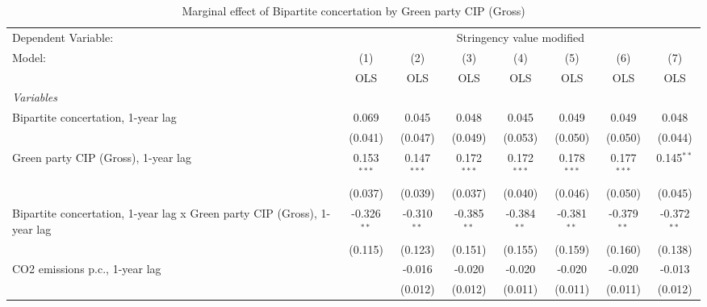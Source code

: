 
\begin{table}[htbp]
   \caption{Marginal effect of Bipartite concertation by Green party CIP (Gross)}
   \centering
   \begin{tabular}{lccccccc}
      \toprule
      Dependent Variable: & \multicolumn{7}{c}{Stringency value modified}\\
      Model:                                                                   & (1)           & (2)           & (3)           & (4)           & (5)           & (6)           & (7)\\  
                                                                               &  OLS          & OLS           & OLS           & OLS           & OLS           & OLS           & OLS\\  
      \midrule
      \emph{Variables}\\
      Bipartite concertation, 1-year lag                                       & 0.069         & 0.045         & 0.048         & 0.045         & 0.049         & 0.049         & 0.048\\   
                                                                               & (0.041)       & (0.047)       & (0.049)       & (0.053)       & (0.050)       & (0.050)       & (0.044)\\   
      Green party CIP (Gross), 1-year lag                                      & 0.153$^{***}$ & 0.147$^{***}$ & 0.172$^{***}$ & 0.172$^{***}$ & 0.178$^{***}$ & 0.177$^{***}$ & 0.145$^{**}$\\   
                                                                               & (0.037)       & (0.039)       & (0.037)       & (0.040)       & (0.046)       & (0.050)       & (0.045)\\   
      Bipartite concertation, 1-year lag x Green party CIP (Gross), 1-year lag & -0.326$^{**}$ & -0.310$^{**}$ & -0.385$^{**}$ & -0.384$^{**}$ & -0.381$^{**}$ & -0.379$^{**}$ & -0.372$^{**}$\\   
                                                                               & (0.115)       & (0.123)       & (0.151)       & (0.155)       & (0.159)       & (0.160)       & (0.138)\\   
      CO2 emissions p.c., 1-year lag                                           &               & -0.016        & -0.020        & -0.020        & -0.020        & -0.020        & -0.013\\   
                                                                               &               & (0.012)       & (0.012)       & (0.011)       & (0.011)       & (0.011)       & (0.012)\\   

\end{tabular}
\end{table}

